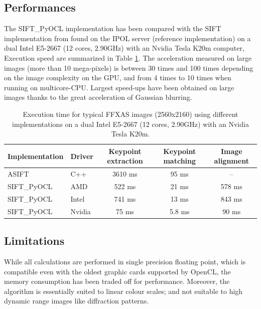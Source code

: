 \documentclass[preprint]{iucr}
\begin{document}
\subsection{Performances}

The SIFT\_PyOCL implementation has been compared with the SIFT
implementation from \cite{ASIFT} found on the IPOL server (reference
implementation) on a dual Intel E5-2667 (12 cores, 2.90GHz) with an Nvidia Tesla
K20m computer, Execution speed are summarized in Table \ref{bench}.
The acceleration measured on large images (more than 10 mega-pixels) is between
30 times and 100 times depending on the image complexity on the GPU, and from 4
times to 10 times when running on multicore-CPU.
Largest speed-ups have been obtained on large images thanks to the
great acceleration of Gaussian blurring.

\begin{table}
\caption{Execution time for typical FFXAS images (2560x2160) using different
implementations on a dual Intel E5-2667 (12 cores, 2.90GHz) with an Nvidia Tesla
K20m.}
\label{bench}
\vspace{1mm}
\begin{center}
\begin{tabular}{l l ccc}
Implementation & Driver & Keypoint extraction & Keypoint matching &
Image alignment\\
\hline
ASIFT        &   C++     &   3610 ms  & 95 ms  & --  \\
SIFT\_PyOCL  &   AMD  &   522 ms  &  21 ms&  578 ms \\
SIFT\_PyOCL  &   Intel  &   741 ms  &  13 ms&  843 ms\\
SIFT\_PyOCL  &   Nvidia  &    75 ms  &  5.8 ms & 90 ms\\
\end{tabular}
\end{center}
\end{table}



\subsection{Limitations}
While all calculations are performed in single precision floating point,
which is
compatible even with the oldest graphic cards supported by OpenCL, the
memory consumption has been traded off for performance.
Moreover, the algorithm is essentially suited
to linear colour scales; and  not suitable to high dynamic range
images like diffraction patterns.
\end{document}
